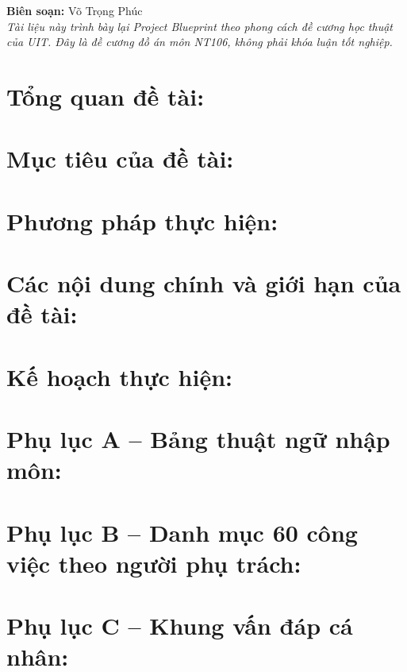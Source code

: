 \documentclass{template/nt106}
\begin{document}
\printinfo

\begin{center}
\textbf{Biên soạn:} Võ Trọng Phúc\\
\textit{Tài liệu này trình bày lại Project Blueprint theo phong cách đề cương học thuật của UIT. Đây là đề cương đồ án môn NT106, không phải khóa luận tốt nghiệp.}
\end{center}

\vspace*{1ex}

\section{Tổng quan đề tài:}
\label{sec:tong-quan-de-tai}


\section{Mục tiêu của đề tài:}
\label{sec:muc-tieu-de-tai}


\section{Phương pháp thực hiện:}
\label{sec:phuong-phap-thuc-hien}


\section{Các nội dung chính và giới hạn của đề tài:}
\label{sec:noi-dung}


\section{Kế hoạch thực hiện:}
\label{sec:ke-hoach}


\section{Phụ lục A -- Bảng thuật ngữ nhập môn:}


\section{Phụ lục B -- Danh mục 60 công việc theo người phụ trách:}


\section{Phụ lục C -- Khung vấn đáp cá nhân:}

\end{document}
